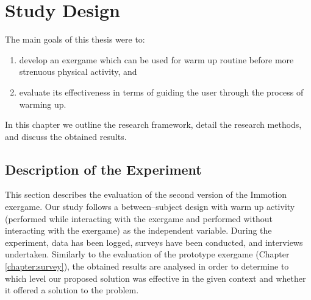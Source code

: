 \chapter{Study Design}
\label{chapter:studydesign}
The main goals of this thesis were to:
\begin{enumerate}
\item develop an exergame which can be used for warm up routine before more strenuous physical activity, and
\item evaluate its effectiveness in terms of guiding the user through the process of warming up.
\end{enumerate} In this chapter we outline the research framework, detail the research methods, and discuss the obtained results.
\section{Description of the Experiment}
This section describes the evaluation of the second version of the Immotion exergame. Our study follows a between–subject design with warm up activity (performed while
interacting with the exergame and performed without interacting with the exergame) as the independent
variable. During the experiment, data has been logged, surveys have been conducted, and interviews undertaken. Similarly to the evaluation of the prototype exergame (Chapter \ref{chapter:survey}), the obtained results are analysed in order to determine to which level our proposed solution was effective in the given context and whether it offered a solution to the problem.

